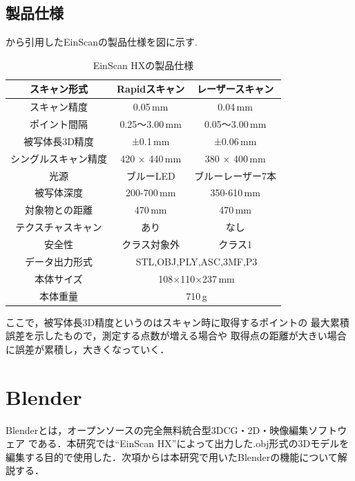 \documentclass{ltjsreport}
\begin{document}
		\subsection{製品仕様}
			\cite{ref:4}から引用したEinScanの製品仕様を図に示す.
			\begin{table}[H]
			\begin{center}
			\caption{EinScan HXの製品仕様}
			\label{tab:EinScan}
			\begin{tabular}{c|cc} \toprule
				スキャン形式&Rapidスキャン&レーザースキャン\\ \hline
				スキャン精度&0.05\,mm&0.04\,mm\\
				ポイント間隔&0.25～3.00\,mm&0.05～3.00\,mm\\
				被写体長3D精度&±0.1\,mm&±0.06\,mm\\
				シングルスキャン精度&420 × 440\,mm&380 × 400\,mm\\
				光源&ブルーLED&ブルーレーザー7本\\
				被写体深度&200-700\,mm&350-610\,mm\\
				対象物との距離&470\,mm&470\,mm\\
				テクスチャスキャン&あり&なし\\
				安全性&クラス対象外&クラス1\\ \hline
				データ出力形式&\multicolumn{2}{c}{STL,OBJ,PLY,ASC,3MF,P3}\\
				本体サイズ&\multicolumn{2}{c}{108×110×237\,mm}\\
				本体重量&\multicolumn{2}{c}{710\,g}\\
				\bottomrule
			\end{tabular}
			\end{center}
			\end{table}
			ここで，被写体長3D精度というのはスキャン時に取得するポイントの
			最大累積誤差を示したもので，測定する点数が増える場合や
			取得点の距離が大きい場合に誤差が累積し，大きくなっていく．

	\section{Blender}
		Blenderとは，オープンソースの完全無料統合型3DCG・2D・映像編集ソフトウェア
		である．本研究では``EinScan HX''によって出力した.obj形式の3Dモデルを
		編集する目的で使用した．次項からは本研究で用いたBlenderの機能について解説する．
\end{document}
